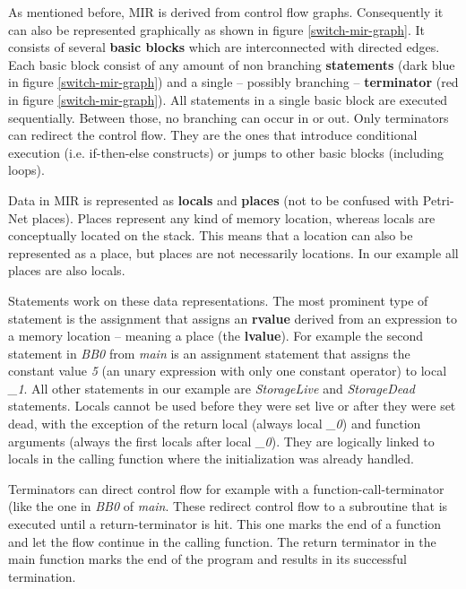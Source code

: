 As mentioned before, MIR is derived from control flow graphs\cite[chapter 2.17]{rustc-guide}.
Consequently it can also be represented graphically as shown in figure \ref{switch-mir-graph}.
It consists of several \textbf{basic blocks} which are interconnected with directed edges.
Each basic block consist of any amount of non branching \textbf{statements} (dark blue in figure \ref{switch-mir-graph}) and a single -- possibly branching -- \textbf{terminator} (red in figure \ref{switch-mir-graph}).
All statements in a single basic block are executed sequentially.
Between those, no branching can occur in or out.
Only terminators can redirect the control flow.
They are the ones that introduce conditional execution (i.e. if-then-else constructs) or jumps to other basic blocks (including loops).

Data in MIR is represented as \textbf{locals} and \textbf{places} (not to be confused with Petri-Net places).
Places represent any kind of memory location, whereas locals are conceptually located on the stack.
This means that a location can also be represented as a place, but places are not necessarily locations.
In our example all places are also locals.

Statements work on these data representations.
The most prominent type of statement is the assignment that assigns an \textbf{rvalue} derived from an expression to a memory location -- meaning a place (the \textbf{lvalue}).
For example the second statement in \textit{BB0} from \textit{main} is an assignment statement that assigns the constant value \textit{5} (an unary expression with only one constant operator) to local \textit{\_1}.
All other statements in our example are \textit{StorageLive} and \textit{StorageDead} statements.
Locals cannot be used before they were set live or after they were set dead, with the exception of the return local (always local \textit{\_0}) and function arguments (always the first locals after local \textit{\_0}).
They are logically linked to locals in the calling function where the initialization was already handled.

Terminators can direct control flow for example with a function-call-terminator (like the one in \textit{BB0} of \textit{main}.
These redirect control flow to a subroutine that is executed until a return-terminator is hit.
This one marks the end of a function and let the flow continue in the calling function.
The return terminator in the main function marks the end of the program and results in its successful termination.


